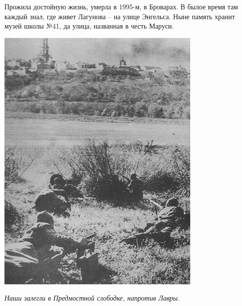 Прожила достойную жизнь, умерла в 1995-м, в Броварах. В былое время там каждый знал, где живет Лагунова – на улице Энгельса. Ныне память хранит музей школы №41, да улица, названная в честь Маруси. 
\vspace*{\fill}
\begin{center}
\includegraphics[width=\linewidth]{chast-gorodki/cherto/predmost-j.jpg}

\textit{Наши залегли в Предмостной слободке, напротив Лавры.}
\end{center}
\vspace*{\fill}
\newpage
\vspace*{\fill}
